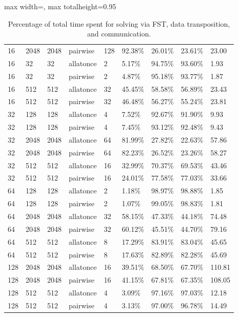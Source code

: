 \documentclass[11pt]{article}
\begin{document}
\begin{table}
\begin{adjustbox}{max width=\textwidth, max totalheight=0.95\textheight}
\begin{tabular}{lllllllll}
      16  & 2048 & 2048 & pairwise  & 128  & 92.38\% & 26.01\%      & 23.61\%          & 23.00  \\
      16  & 32   & 32   & allatonce & 2    & 5.17\%  & 94.75\%      & 93.60\%          & 1.93   \\
      16  & 32   & 32   & pairwise  & 2    & 4.87\%  & 95.18\%      & 93.77\%          & 1.87   \\
      16  & 512  & 512  & allatonce & 32   & 45.45\% & 58.58\%      & 56.89\%          & 23.43  \\
      16  & 512  & 512  & pairwise  & 32   & 46.48\% & 56.27\%      & 55.24\%          & 23.81  \\
      32  & 128  & 128  & allatonce & 4    & 7.52\%  & 92.67\%      & 91.90\%          & 9.93   \\
      32  & 128  & 128  & pairwise  & 4    & 7.45\%  & 93.12\%      & 92.48\%          & 9.43   \\
      32  & 2048 & 2048 & allatonce & 64   & 81.99\% & 27.82\%      & 22.63\%          & 57.86  \\
      32  & 2048 & 2048 & pairwise  & 64   & 82.23\% & 26.52\%      & 23.26\%          & 58.27  \\
      32  & 512  & 512  & allatonce & 16   & 32.99\% & 70.37\%      & 69.53\%          & 43.46  \\
      32  & 512  & 512  & pairwise  & 16   & 24.01\% & 77.58\%      & 77.03\%          & 33.66  \\
      64  & 128  & 128  & allatonce & 2    & 1.18\%  & 98.97\%      & 98.88\%          & 1.85   \\
      64  & 128  & 128  & pairwise  & 2    & 1.07\%  & 99.05\%      & 98.83\%          & 1.81   \\
      64  & 2048 & 2048 & allatonce & 32   & 58.15\% & 47.33\%      & 44.18\%          & 74.48  \\
      64  & 2048 & 2048 & pairwise  & 32   & 60.12\% & 45.51\%      & 44.70\%          & 79.16  \\
      64  & 512  & 512  & allatonce & 8    & 17.29\% & 83.91\%      & 83.04\%          & 45.65  \\
      64  & 512  & 512  & pairwise  & 8    & 17.63\% & 82.89\%      & 82.28\%          & 45.69  \\
      128 & 2048 & 2048 & allatonce & 16   & 39.51\% & 68.50\%      & 67.70\%          & 110.81 \\
      128 & 2048 & 2048 & pairwise  & 16   & 41.15\% & 67.81\%      & 67.35\%          & 108.05 \\
      128 & 512  & 512  & allatonce & 4    & 3.09\%  & 97.16\%      & 97.03\%          & 12.18  \\
      128 & 512  & 512  & pairwise  & 4    & 3.13\%  & 97.00\%      & 96.78\%          & 14.49  \\
      \bottomrule
    \end{tabular}
  \end{adjustbox}
  \caption{Percentage of total time spent for solving via FST, data transposition, and communication.}
  \label{tab:time-percentages}
\end{table}
\end{document}
